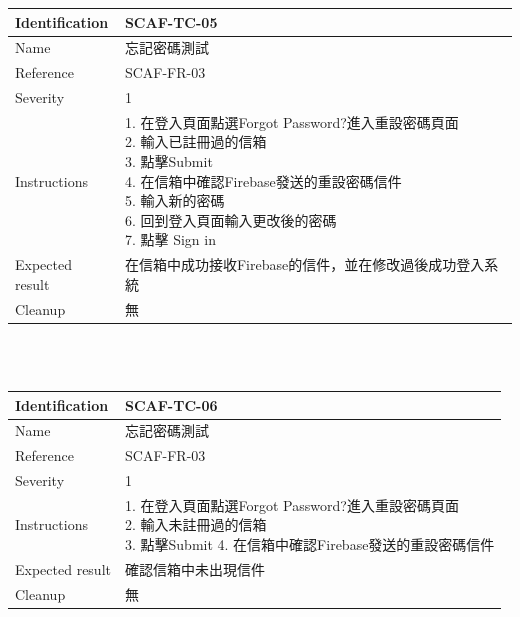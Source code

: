 \documentclass{report}
\begin{document}
\begin{tabularx}{\textwidth}{
  |p{}%
  |p{}|%
  }
  \hline
  \centering Identification &  SCAF-TC-05 \\
  \hline
  \centering Name & 忘記密碼測試 \\
  \hline
  \centering Reference & SCAF-FR-03 \\
  \hline
  \centering Severity & 1 \\
  \hline
  \centering Instructions & 
  \makecell[l]{
    1. 在登入頁面點選Forgot Password?進入重設密碼頁面 \\
    2. 輸入已註冊過的信箱  \\
    3. 點擊Submit \\
    4. 在信箱中確認Firebase發送的重設密碼信件 \\
    5. 輸入新的密碼 \\
    6. 回到登入頁面輸入更改後的密碼  \\
    7. 點擊 Sign in
  }\\
  \hline
  \centering Expected result & 在信箱中成功接收Firebase的信件，並在修改過後成功登入系統 \\
  \hline
  \centering Cleanup & 無 \\
  \hline
\end{tabularx}
\\
\newline
\\
\begin{tabularx}{\textwidth}{
  |p{}%
  |p{}|%
  }
  \hline
  \centering Identification &  SCAF-TC-06 \\
  \hline
  \centering Name & 忘記密碼測試 \\
  \hline
  \centering Reference & SCAF-FR-03 \\
  \hline
  \centering Severity & 1 \\
  \hline
  \centering Instructions & 
  \makecell[l]{
    1. 在登入頁面點選Forgot Password?進入重設密碼頁面 \\
    2. 輸入未註冊過的信箱  \\
    3. 點擊Submit
    4. 在信箱中確認Firebase發送的重設密碼信件
  }\\
  \hline
  \centering Expected result & 確認信箱中未出現信件 \\
  \hline
  \centering Cleanup & 無 \\
  \hline
\end{tabularx}
\end{document}
